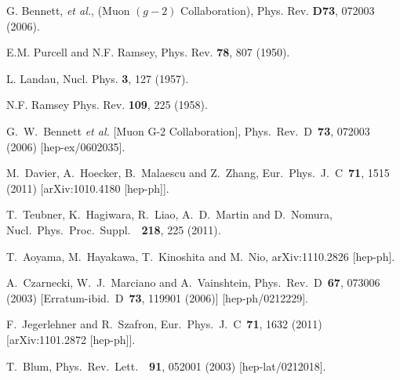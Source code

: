 \begin{thebibliography}{99}
 G. Bennett, {\it et al.},  (Muon $(g-2)$ Collaboration),
Phys. Rev. {\bf D73}, 072003 (2006).

E.M. Purcell and N.F. Ramsey,
 Phys. Rev. {\bf 78}, 807 (1950).

  L. Landau, Nucl. Phys. {\bf 3}, 127 (1957).

 N.F. Ramsey Phys. Rev. {\bf 109}, 225 (1958).


  G.~W.~Bennett {\it et al.} [Muon G-2 Collaboration],
  Phys.\ Rev.\ D\ {\bf 73}, 072003  (2006)
  [hep-ex/0602035].

  M.~Davier, A.~Hoecker, B.~Malaescu and Z.~Zhang,
  Eur.\ Phys.\ J.\ C\ {\bf 71}, 1515  (2011)
  [arXiv:1010.4180 [hep-ph]].

  T.~Teubner, K.~Hagiwara, R.~Liao, A.~D.~Martin and D.~Nomura,
  Nucl.\ Phys.\ Proc.\ Suppl.\ \ {\bf 218}, 225  (2011).

  T.~Aoyama, M.~Hayakawa, T.~Kinoshita and M.~Nio,
  arXiv:1110.2826 [hep-ph].

  A.~Czarnecki, W.~J.~Marciano and A.~Vainshtein,
  Phys.\ Rev.\ D\ {\bf 67}, 073006  (2003)
  [Erratum-ibid.\ D\ {\bf 73}, 119901  (2006)]
  [hep-ph/0212229].

  F.~Jegerlehner and R.~Szafron,
  Eur.\ Phys.\ J.\ C\ {\bf 71}, 1632  (2011)
  [arXiv:1101.2872 [hep-ph]].

  T.~Blum,
  Phys.\ Rev.\ Lett.\ \ {\bf 91}, 052001  (2003)
  [hep-lat/0212018].


\end{thebibliography}
